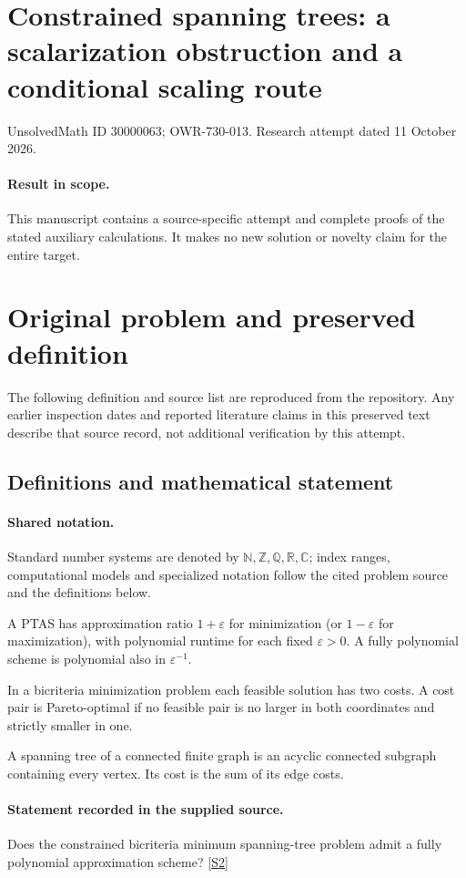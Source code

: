 \documentclass[11pt]{article}
\begin{document}
\section*{Constrained spanning trees: a scalarization obstruction and a conditional scaling route}
\noindent UnsolvedMath ID 30000063; OWR-730-013. Research attempt dated 11 October 2026.
\paragraph{Result in scope.}This manuscript contains a source-specific attempt and complete proofs of the stated auxiliary calculations. It makes no new solution or novelty claim for the entire target.
\section{Original problem and preserved definition}
The following definition and source list are reproduced from the repository. Any earlier inspection dates and reported literature claims in this preserved text describe that source record, not additional verification by this attempt.
\subsection{Definitions and mathematical statement}

\paragraph{Shared notation.}Standard number systems are denoted by $\mathbb N,\mathbb Z,\mathbb Q,\mathbb R,\mathbb C$; index ranges, computational models and specialized notation follow the cited problem source and the definitions below.


A PTAS has approximation ratio $1+\varepsilon$ for minimization (or $1-\varepsilon$ for maximization), with polynomial runtime for each fixed $\varepsilon>0$. A fully polynomial scheme is polynomial also in $\varepsilon^{-1}$.

In a bicriteria minimization problem each feasible solution has two costs. A cost pair is Pareto-optimal if no feasible pair is no larger in both coordinates and strictly smaller in one.

A spanning tree of a connected finite graph is an acyclic connected subgraph containing every vertex. Its cost is the sum of its edge costs.
\paragraph{Statement recorded in the supplied source.}
Does the constrained bicriteria minimum spanning-tree problem admit a fully polynomial approximation scheme? \href{https://doi.org/10.4171/owr/2004/28}{[S2]}
\end{document}
